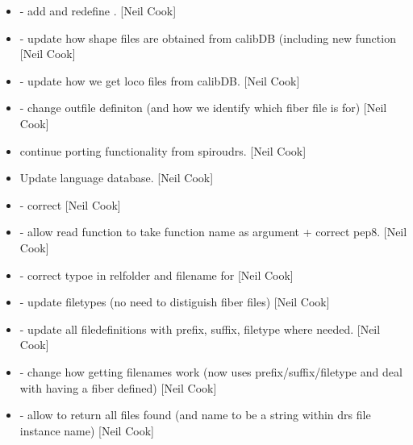 \documentclass[a4paper,10pt,english]{report}
\begin{document}
\begin{itemize}
\item {} 
 - add  and redefine
. {[}Neil Cook{]}

\item {} 
 - update how shape files are obtained from
calibDB (including new function  {[}Neil Cook{]}

\item {} 
 - update how we get loco files from
calibDB. {[}Neil Cook{]}

\item {} 
 - change outfile definiton (and how
we identify which fiber file is for) {[}Neil Cook{]}

\item {} 
 \textendash{} continue porting functionality from spiroudrs.
{[}Neil Cook{]}

\item {} 
Update language database. {[}Neil Cook{]}

\item {} 
 - correct  {[}Neil Cook{]}

\item {} 
 - allow read function to take function name as argument +
correct pep8. {[}Neil Cook{]}

\item {} 
 - correct typoe in relfolder and filename for
 {[}Neil Cook{]}

\item {} 
 - update filetypes (no need to distiguish fiber
files) {[}Neil Cook{]}

\item {} 
 - update all filedefinitions with prefix, suffix,
filetype where needed. {[}Neil Cook{]}

\item {} 
 - change how getting filenames work (now uses
prefix/suffix/filetype and deal with having a fiber defined) {[}Neil
Cook{]}

\item {} 
 - allow  to return all files found
(and name to be a string within drs file instance name) {[}Neil Cook{]}


\end{itemize}
\end{document}
